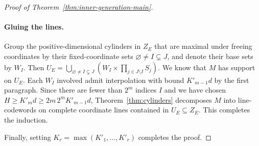 \documentclass[10pt,a4paper]{amsart}
\newcommand{\cB}{\mathcal B}
\theoremstyle{plain}
\theoremstyle{definition}
\theoremstyle{remark}
\begin{document}
\begin{proof}[Proof of Theorem~\ref{thm:inner-generation-main}]
\paragraph{Gluing the lines.}
Group the positive-dimensional cylinders in \(Z_E\) that are
maximal under freeing coordinates by their fixed-coordinate sets
\(\varnothing\ne I\subsetneq J\), and denote their base sets
by \(W_I\). Then
$U_E=\bigcup_{\varnothing\ne I\subsetneq J}
\left(W_I\times\prod_{j\in J \setminus I}S_j\right)$.
We know that \(M\) has support on \(U_E\). Each $W_I$ involved admit interpolation with bound $K'_{m-1}d$ by the
first paragraph. Since there are fewer than \(2^m\) indices $I$ and we have chosen
$H\ge K'_md\ge 2m\,2^mK'_{m-1}d$, Theorem~\ref{thm:cylinders} decomposes \(M\) into line-codewords
on complete coordinate lines contained in \(U_E \subseteq Z_E\). This completes the induction.

Finally, setting $K_r = \max(K'_1,\dots,K'_r)$ completes the proof.

\end{proof}
\end{document}
